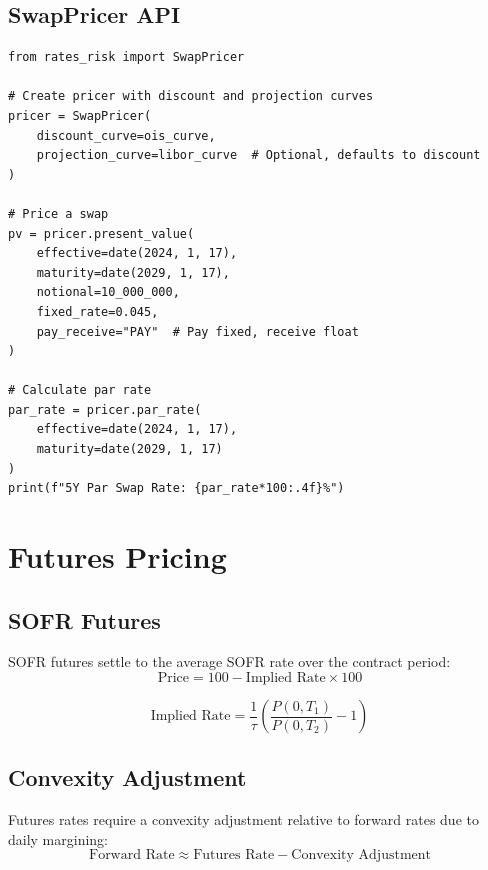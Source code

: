 \documentclass[12pt,a4paper]{report}
\begin{document}
\subsection{SwapPricer API}

\begin{lstlisting}
from rates_risk import SwapPricer

# Create pricer with discount and projection curves
pricer = SwapPricer(
    discount_curve=ois_curve,
    projection_curve=libor_curve  # Optional, defaults to discount
)

# Price a swap
pv = pricer.present_value(
    effective=date(2024, 1, 17),
    maturity=date(2029, 1, 17),
    notional=10_000_000,
    fixed_rate=0.045,
    pay_receive="PAY"  # Pay fixed, receive float
)

# Calculate par rate
par_rate = pricer.par_rate(
    effective=date(2024, 1, 17),
    maturity=date(2029, 1, 17)
)
print(f"5Y Par Swap Rate: {par_rate*100:.4f}%")
\end{lstlisting}

\section{Futures Pricing}

\subsection{SOFR Futures}

SOFR futures settle to the average SOFR rate over the contract period:
\begin{equation}
    \text{Price} = 100 - \text{Implied Rate} \times 100
\end{equation}

\begin{equation}
    \text{Implied Rate} = \frac{1}{\tau} \left( \frac{P(0,T_1)}{P(0,T_2)} - 1 \right)
\end{equation}

\subsection{Convexity Adjustment}

Futures rates require a convexity adjustment relative to forward rates due to daily margining:
\begin{equation}
    \text{Forward Rate} \approx \text{Futures Rate} - \text{Convexity Adjustment}
\end{equation}
\end{document}
